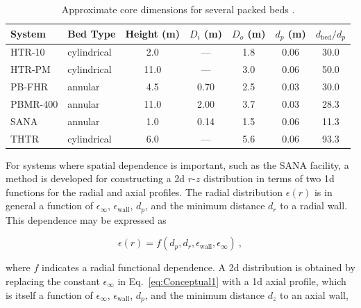 \begin{table}[h!]
\caption{Approximate core dimensions for several packed beds \cite{gao,htrpm,pbfhr,boer,SANA,thtr_1990}.}
\centering
\begin{tabular}{l l c c c c c}
\toprule
\textbf{System} & \textbf{Bed Type} & \textbf{Height (\si{\meter})} & \textbf{{\boldmath\(D_i\)} (\si{\meter})} & \textbf{{\boldmath\(D_o\)} (\si{\meter})} & \textbf{{\boldmath\(d_p\)} (\si{\meter})} & \textbf{{\boldmath\(d_\text{bed}/d_p\)}} \\
\midrule
HTR-10 & cylindrical & \hspace{0.5em}2.0 & --- & 1.8 & 0.06 & 30.0\\
HTR-PM & cylindrical & 11.0 & --- & 3.0 & 0.06 & 50.0\\
PB-FHR & annular & \hspace{0.5em}4.5 & 0.70 & 2.5 & 0.03 & 30.0\\
PBMR-400 & annular & 11.0 & 2.0\color{white}0\color{black}& 3.7 & 0.03 & 28.3\\
SANA & annular & \hspace{0.5em}1.0 & 0.14 & 1.5 & 0.06 & 11.3\\
THTR & cylindrical & \hspace{0.5em}6.0 & --- & 5.6 & 0.06 & 93.3\\
\bottomrule
\end{tabular}
\label{table:DpDbed}
\end{table}

For systems where spatial dependence is important, such as the SANA facility, a method is developed for constructing a \gls{2d} \(r\)-\(z\) distribution in terms of two \gls{1d} functions for the radial and axial profiles. The radial distribution \(\epsilon(r)\) is in general a function of \(\epsilon_\infty\), \(\epsilon_\text{wall}\), \(d_p\), and the minimum distance \(d_r\) to a radial wall. This dependence may be expressed as

\begin{equation}
\label{eq:Conceptual1}
\epsilon(r)=f\left(d_p, d_r, \epsilon_\text{wall},\epsilon_\infty\right)\ ,
\end{equation}

\noindent where \(f\) indicates a radial functional dependence. A \gls{2d} distribution is obtained by replacing the constant \(\epsilon_\infty\) in Eq.\ \eqref{eq:Conceptual1} with a \gls{1d} axial profile, which is itself a function of \(\epsilon_\infty\), \(\epsilon_\text{wall}\), \(d_p\), and the minimum distance \(d_z\) to an axial wall,

